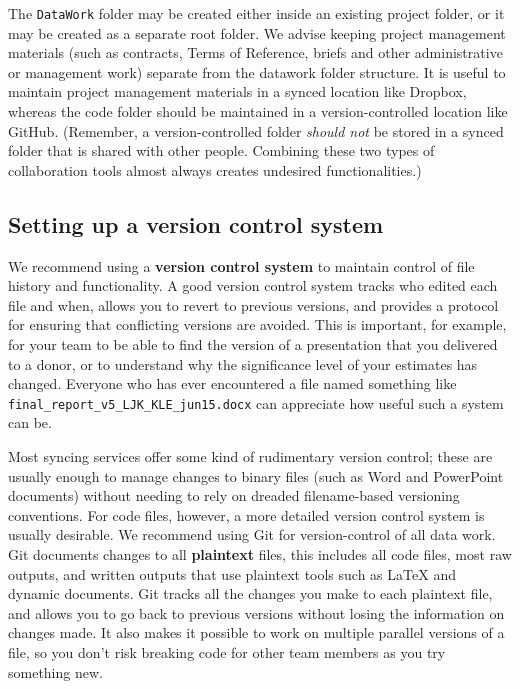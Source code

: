The \texttt{DataWork} folder may be created either inside
an existing project folder, or it may be created as a separate root folder.
We advise keeping project management materials
(such as contracts, Terms of Reference, briefs and other administrative or management work)
separate from the datawork folder structure.
It is useful to maintain project management materials in a synced location like Dropbox,
whereas the code folder should be maintained in a version-controlled location like GitHub.
(Remember, a version-controlled folder \textit{should not}
be stored in a synced folder that is shared with other people.
Combining these two types of collaboration tools
almost always creates undesired functionalities.)

\subsection{Setting up a version control system}
We recommend using a \textbf{version control system} to
maintain control of file history and functionality.
A good version control system tracks who edited each file and when,
allows you to revert to previous versions,
and provides a protocol for ensuring that conflicting versions are avoided.
This is important, for example, for your team
to be able to find the version of a presentation that you delivered to a donor,
or to understand why the significance level of your estimates has changed.
Everyone who has ever encountered a file named something like \texttt{final\_report\_v5\_LJK\_KLE\_jun15.docx}
can appreciate how useful such a system can be.

Most syncing services offer some kind of rudimentary version control;
these are usually enough to manage changes to binary files (such as Word and PowerPoint documents)
without needing to rely on dreaded filename-based versioning conventions.
For code files, however, a more detailed version control system is usually desirable.
We recommend using Git for version-control of all data work.
Git documents changes to all \textbf{plaintext} files,
this includes all code files, most raw outputs,
and written outputs that use plaintext tools such as
{\LaTeX} and dynamic documents.\index{{\LaTeX}}
Git tracks all the changes you make to each plaintext file,
and allows you to go back to previous versions without losing the information on changes made.
It also makes it possible to work on multiple parallel versions of a file,
so you don't risk breaking code for other team members as you try something new.


